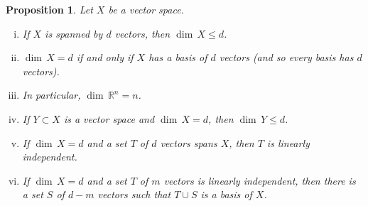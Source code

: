 \documentclass[12pt]{book}
\newcommand{\R}{{\mathbb{R}}}
\theoremstyle{plain}
\newtheorem{prop}[thm]{Proposition}
\theoremstyle{remark}
\theoremstyle{definition}
\theoremstyle{exercise}
\theoremstyle{example}
\begin{document}
\begin{prop}
Let $X$ be a vector space.
\begin{enumerate}[(i)]
\item
If $X$ is spanned by $d$ vectors, then $\dim \, X \leq d$.
\item $\dim \, X = d$ if and only if $X$ has a basis of $d$
vectors (and so every basis has $d$ vectors).
\item In particular, $\dim \, \R^n = n$.
\item If $Y \subset X$ is a vector space and $\dim \, X = d$,
then $\dim \, Y \leq d$.
\item If $\dim \, X = d$ and a set $T$ of $d$ vectors spans $X$,
then $T$ is linearly independent.
\item If $\dim \, X = d$ and a set $T$ of $m$ vectors is
linearly independent, then there is a set $S$ of $d-m$
vectors such that $T \cup S$ is a basis of $X$.
\end{enumerate}
\end{prop}
\end{document}
